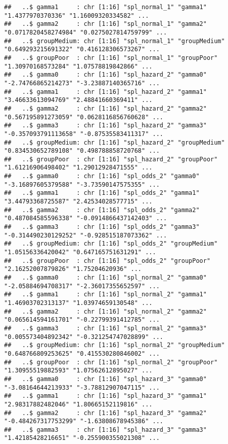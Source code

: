 \documentclass[
]{article}
\begin{document}
\begin{verbatim}
##   ..$ gamma1     : chr [1:16] "spl_normal_1" "gamma1" "1.4377970370336" "1.16009320334582" ...
##   ..$ gamma2     : chr [1:16] "spl_normal_1" "gamma2" "0.0717820458274984" "0.0275027814759799" ...
##   ..$ groupMedium: chr [1:16] "spl_normal_1" "groupMedium" "0.649293215691322" "0.416128306573267" ...
##   ..$ groupPoor  : chr [1:16] "spl_normal_1" "groupPoor" "1.30970168573284" "1.07578819842866" ...
##   ..$ gamma0     : chr [1:16] "spl_hazard_2" "gamma0" "-2.74766865214273" "-3.23887140365716" ...
##   ..$ gamma1     : chr [1:16] "spl_hazard_2" "gamma1" "3.46633613094769" "2.48841660369411" ...
##   ..$ gamma2     : chr [1:16] "spl_hazard_2" "gamma2" "0.567195891273059" "0.0628116856760628" ...
##   ..$ gamma3     : chr [1:16] "spl_hazard_2" "gamma3" "-0.357093791113658" "-0.87535583411317" ...
##   ..$ groupMedium: chr [1:16] "spl_hazard_2" "groupMedium" "0.834530652789108" "0.498788858720768" ...
##   ..$ groupPoor  : chr [1:16] "spl_hazard_2" "groupPoor" "1.61216906498402" "1.29012928471555" ...
##   ..$ gamma0     : chr [1:16] "spl_odds_2" "gamma0" "-3.16897605379588" "-3.73590147575355" ...
##   ..$ gamma1     : chr [1:16] "spl_odds_2" "gamma1" "3.44793368725587" "2.42534028577715" ...
##   ..$ gamma2     : chr [1:16] "spl_odds_2" "gamma2" "0.487084585596338" "-0.0914866437142403" ...
##   ..$ gamma3     : chr [1:16] "spl_odds_2" "gamma3" "-0.314490230129252" "-0.928515187073362" ...
##   ..$ groupMedium: chr [1:16] "spl_odds_2" "groupMedium" "1.05156336420042" "0.647165751631291" ...
##   ..$ groupPoor  : chr [1:16] "spl_odds_2" "groupPoor" "2.16252007879826" "1.75204620936" ...
##   ..$ gamma0     : chr [1:16] "spl_normal_2" "gamma0" "-2.05884694708317" "-2.36017355652597" ...
##   ..$ gamma1     : chr [1:16] "spl_normal_2" "gamma1" "1.46903702313137" "1.03974659130548" ...
##   ..$ gamma2     : chr [1:16] "spl_normal_2" "gamma2" "0.065614594161701" "-0.22799391412785" ...
##   ..$ gamma3     : chr [1:16] "spl_normal_2" "gamma3" "0.005573404892342" "-0.321254747028899" ...
##   ..$ groupMedium: chr [1:16] "spl_normal_2" "groupMedium" "0.648766809253625" "0.415530280846002" ...
##   ..$ groupPoor  : chr [1:16] "spl_normal_2" "groupPoor" "1.30955519882593" "1.07562612895027" ...
##   ..$ gamma0     : chr [1:16] "spl_hazard_3" "gamma0" "-3.08164644213933" "-3.78812907047115" ...
##   ..$ gamma1     : chr [1:16] "spl_hazard_3" "gamma1" "2.98317882482046" "1.80665152119816" ...
##   ..$ gamma2     : chr [1:16] "spl_hazard_3" "gamma2" "-0.484267317753299" "-1.63808678945386" ...
##   ..$ gamma3     : chr [1:16] "spl_hazard_3" "gamma3" "1.42185428216651" "-0.255900355021308" ...

\end{verbatim}
\end{document}
